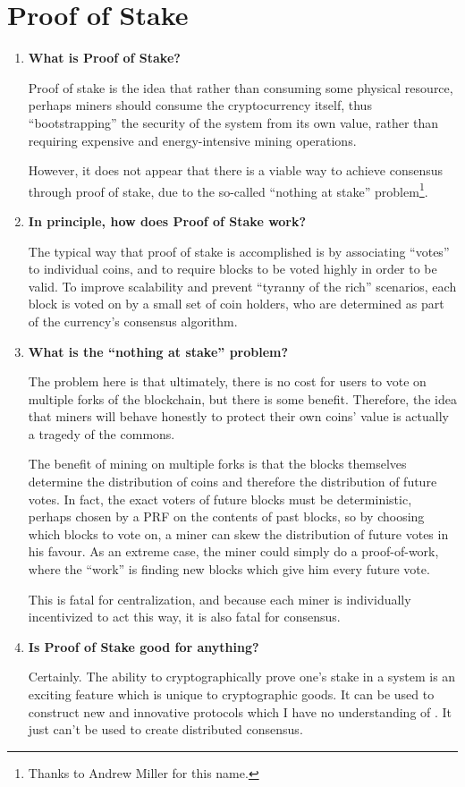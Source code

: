 \documentclass[letterpaper]{article}
\theoremstyle{xxx}
\theoremstyle{evil}
\theoremstyle{yyy}
\theoremstyle{plain}
\theoremstyle{zzz}
\begin{document}
\section{Proof of Stake}
\begin{enumerate}
\item \textbf{What is Proof of Stake?}

Proof of stake is the idea that rather than consuming some physical resource,
perhaps miners should consume the cryptocurrency itself, thus ``bootstrapping''
the security of the system from its own value, rather than requiring expensive
and energy-intensive mining operations.

However, it does not appear that there is a viable way to achieve consensus
through proof of stake, due to the so-called ``nothing at stake''
problem\footnote{Thanks to Andrew Miller for this name.}.

\item \textbf{In principle, how does Proof of Stake work?}

The typical way that proof of stake is accomplished is by associating ``votes''
to individual coins, and to require blocks to be voted highly in order to be
valid. To improve scalability and prevent ``tyranny of the rich'' scenarios, each
block is voted on by a small set of coin holders, who are determined as part
of the currency's consensus algorithm.

\item \textbf{What is the ``nothing at stake'' problem?}

The problem here is that ultimately, there is no cost for users to vote on multiple
forks of the blockchain, but there is some benefit. Therefore, the idea that miners
will behave honestly to protect their own coins' value is actually a tragedy of the
commons.

The benefit of mining on multiple forks is that the blocks themselves determine
the distribution of coins and therefore the distribution of future votes. In fact,
the exact voters of future blocks must be deterministic, perhaps chosen by a PRF
on the contents of past blocks, so by choosing which blocks to vote on, a miner
can skew the distribution of future votes in his favour. As an extreme case, the
miner could simply do a proof-of-work, where the ``work'' is finding new blocks
which give him every future vote.

This is fatal for centralization, and because each miner is individually
incentivized to act this way, it is also fatal for consensus.

\item \textbf{Is Proof of Stake good for anything?}

Certainly. The ability to cryptographically prove one's stake in a system is an
exciting feature which is unique to cryptographic goods. It can be used to construct
new and innovative protocols which I have no understanding of \smiley.
It just can't be used to create distributed consensus.


\end{enumerate}
\end{document}

